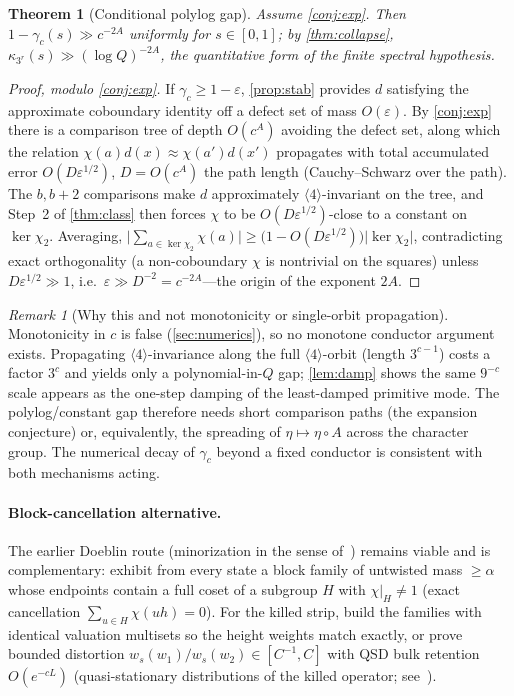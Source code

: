 \documentclass[11pt]{article}
\theoremstyle{plain}
\newtheorem{theorem}{Theorem}
\theoremstyle{definition}
\theoremstyle{remark}
\newtheorem*{remark}{Remark}
\begin{document}
\begin{theorem}[Conditional polylog gap]\label{thm:condpolylog}
Assume \cref{conj:exp}. Then $1-\gamma_c(s)\gg c^{-2A}$ uniformly for
$s\in[0,1]$; by \cref{thm:collapse}, $\kappa_{3^r}(s)\gg(\log Q)^{-2A}$, the
quantitative form of the finite spectral hypothesis.
\end{theorem}
\begin{proof}[Proof, modulo \cref{conj:exp}]
If $\gamma_c\ge1-\varepsilon$, \cref{prop:stab} provides $d$ satisfying the
approximate coboundary identity off a defect set of mass $O(\varepsilon)$. By
\cref{conj:exp} there is a comparison tree of depth $O(c^A)$ avoiding the defect
set, along which the relation $\chi(a)d(x)\approx\chi(a')d(x')$ propagates with
total accumulated error $O(D\varepsilon^{1/2})$, $D=O(c^A)$ the path length
(Cauchy--Schwarz over the path). The $b,b{+}2$ comparisons make $d$
approximately $\langle4\rangle$-invariant on the tree, and Step~2 of
\cref{thm:class} then forces $\chi$ to be $O(D\varepsilon^{1/2})$-close to a
constant on $\ker\chi_2$. Averaging,
$\bigl|\sum_{a\in\ker\chi_2}\chi(a)\bigr|\ge\bigl(1-O(D\varepsilon^{1/2})\bigr)
\lvert\ker\chi_2\rvert$, contradicting exact orthogonality (a non-coboundary
$\chi$ is nontrivial on the squares) unless $D\varepsilon^{1/2}\gg1$, i.e.\
$\varepsilon\gg D^{-2}=c^{-2A}$---the origin of the exponent $2A$.
\end{proof}

\begin{remark}[Why this and not monotonicity or single-orbit propagation]
Monotonicity in $c$ is false (\cref{sec:numerics}), so no monotone conductor
argument exists. Propagating $\langle4\rangle$-invariance along the full
$\langle4\rangle$-orbit (length $3^{c-1}$) costs a factor $3^c$ and yields only a
polynomial-in-$Q$ gap; \cref{lem:damp} shows the same $9^{-c}$ scale appears as
the one-step damping of the least-damped primitive mode. The polylog/constant
gap therefore needs short comparison paths (the expansion conjecture) or,
equivalently, the spreading of $\eta\mapsto\eta\circ A$ across the character
group. The numerical decay of $\gamma_c$ beyond a fixed conductor is consistent
with both mechanisms acting.
\end{remark}

\paragraph{Block-cancellation alternative.} The earlier Doeblin route
(minorization in the sense of~\cite{meyntweedie}) remains
viable and is complementary: exhibit from every state a block family of
untwisted mass $\ge\alpha$ whose endpoints contain a full coset of a subgroup
$H$ with $\chi|_H\ne1$ (exact cancellation $\sum_{u\in H}\chi(uh)=0$). For the
killed strip, build the families with identical valuation multisets so the
height weights match exactly, or prove bounded distortion
$w_s(w_1)/w_s(w_2)\in[C^{-1},C]$ with QSD bulk retention $O(e^{-cL})$
(quasi-stationary distributions of the killed operator; see~\cite{cmsm2013}).
\end{document}
